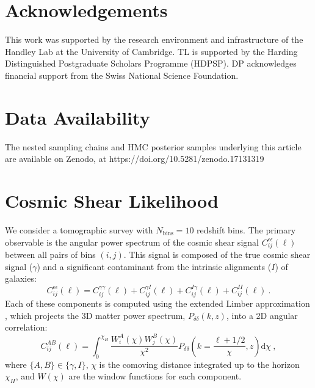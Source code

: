 \documentclass[twocolumn]{openjournal}
\begin{document}
\section*{Acknowledgements}
This work was supported by the research environment and infrastructure of the Handley Lab at the University of Cambridge. TL is supported by the Harding Distinguished Postgraduate Scholars Programme (HDPSP). DP acknowledges financial support from the Swiss National Science Foundation.

\section*{Data Availability}

The nested sampling chains and HMC posterior samples underlying this article are available on Zenodo, at https://doi.org/10.5281/zenodo.17131319


\newpage
\appendix
\section{Cosmic Shear Likelihood}\label{shearlikelihood}
We consider a tomographic survey with $N_{\text{bins}}=10$ redshift bins. The primary observable is the angular power spectrum of the cosmic shear signal $C^{\epsilon \epsilon}_{i j} (\ell)$ between all pairs of bins $(i,j)$. This signal is composed of the true cosmic shear signal ($\gamma$) and a significant contaminant from the intrinsic alignments ($I$) of galaxies:
\begin{equation}
	C^{\epsilon \epsilon}_{i j} (\ell) = C^{\gamma \gamma}_{i j} (\ell) + C^{\gamma I}_{i j} (\ell) + C^{I \gamma}_{i j} (\ell) + C^{I I}_{i j} (\ell) \ .
\end{equation}
Each of these components is computed using the extended Limber approximation \citep{LoVerde_2008}, which projects the 3D matter power spectrum, $P_{\delta \delta}(k,z)$, into a 2D angular correlation:
\begin{equation}
	C^{A B}_{i j} (\ell) = \int_0^{\chi_H} \frac{W_i^A (\chi)  W_j^B (\chi)}{\chi^2}  P_{\delta \delta} \left(k = \frac{\ell + 1/2}{\chi}, z \right) \mathrm{d}\chi \ ,
\end{equation}
where $\{A, B\} \in \{\gamma, I \}$, $\chi$ is the comoving distance integrated up to the horizon $\chi_H$, and $W(\chi)$ are the window functions for each component.
\end{document}
